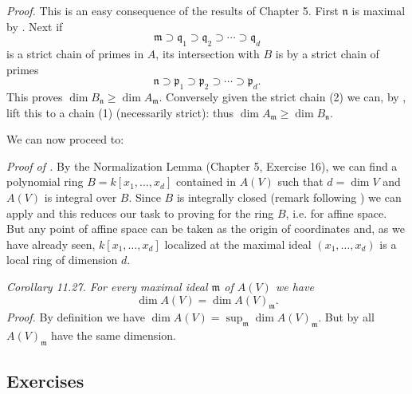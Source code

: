 \textit{Proof.} This is an easy consequence of the results of Chapter 5. First $\mathfrak n$ is maximal by . Next if
\begin{equation}
 \mathfrak m\supset\mathfrak q_1\supset\mathfrak q_2\supset\cdots\supset\mathfrak q_d
 \tag{1}
\end{equation}
is a strict chain of primes in $A$, its intersection with $B$ is by  a strict chain of primes
\begin{equation}
 \mathfrak n\supset\mathfrak p_1\supset\mathfrak p_2\supset\cdots\supset\mathfrak p_d.
 \tag{2}
\end{equation}
This proves $\dim B_{\mathfrak n}\geq\dim A_{\mathfrak m}$. Conversely given the strict chain (2) we can, by , lift this to a chain (1) (necessarily strict): thus $\dim A_{\mathfrak m}\geq\dim B_{\mathfrak n}$. \proofbox

We can now proceed to:

\textit{Proof of .} By the Normalization Lemma (Chapter 5, Exercise 16), we can find a polynomial ring $B=k[x_1,\ldots,x_d]$ contained in $A(V)$ such that $d=\dim V$ and $A(V)$ is integral over $B$. Since $B$ is integrally closed (remark following ) we can apply  and this reduces our task to proving  for the ring $B$, i.e. for affine space. But any point of affine space can be taken as the origin of coordinates and, as we have already seen, $k[x_1,\ldots,x_d]$ localized at the maximal ideal $(x_1,\ldots,x_d)$ is a local ring of dimension $d$. \proofbox

\medskip
\noindent\textit{Corollary 11.27. For every maximal ideal $\mathfrak m$ of $A(V)$ we have}
\[
 \dim A(V)=\dim A(V)_{\mathfrak m}.
\]
\textit{Proof.} By definition we have $\dim A(V)=\sup_{\mathfrak m}\dim A(V)_{\mathfrak m}$. But by  all $A(V)_{\mathfrak m}$ have the same dimension. \proofbox

\subsection{Exercises}

